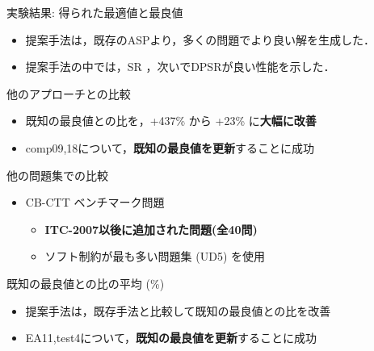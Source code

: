 \documentclass[11pt,dvipdfmx]{beamer}
\begin{document}
\begin{frame}{実験結果: 得られた最適値と最良値}
  \begin{tableA}
    
  \end{tableA}
  \begin{itemize}\small
  \item 提案手法は，既存のASPより，多くの問題でより良い解を生成した．
  \item 提案手法の中では，\textsf{SR} ，次いで\textsf{DPSR}が良い性能を示した．
  \end{itemize}
\end{frame}
\begin{frame}{他のアプローチとの比較}
  \begin{center}
  \begin{tableB}
    
  \end{tableB}
  \end{center}
  \begin{itemize}
      \item 既知の最良値との比を，+437\% から +23\% に\alert{\bf 大幅に改善}
      \item \textsf{comp09,18}について，\alert{\bf 既知の最良値を更新}することに成功
  \end{itemize}
\end{frame}
\begin{frame}{他の問題集での比較}
  \begin{itemize}
  \item CB-CTT ベンチマーク問題
    \begin{itemize}
    \item \textbf{ITC-2007以後に追加された問題(全40問)}
    \item ソフト制約が最も多い問題集 (UD5) を使用
    \end{itemize}
  \end{itemize}
  \begin{exampleblock}{既知の最良値との比の平均 (\%)}
  \begin{center}
    \begin{tableD}
      
    \end{tableD}
  \end{center}
  \end{exampleblock}
  \begin{itemize}
  \item 提案手法は，既存手法と比較して既知の最良値との比を改善
  \item \textsf{EA11,test4}について，\alert{\bf 既知の最良値を更新}することに成功
  \end{itemize}
\end{frame}
\end{document}
